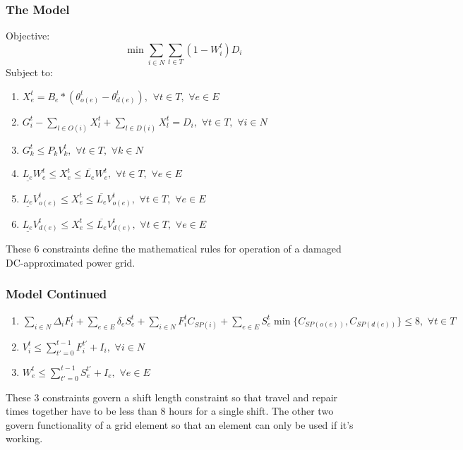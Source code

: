 \documentclass[t, pdftex]{beamer}
\begin{document}
\begin{frame}
\frametitle{The Model}
Objective:
$$ \min \sum_{i \in N} \sum_{t \in T} (1-W_i^t)D_i $$
Subject to:
	\begin{enumerate}[label=(\arabic*), leftmargin=*, itemsep=0.4ex, before={\everymath{\displaystyle}}]
	
	\item $ X_e^t = B_e * (\theta_{o(e)}^t - \theta_{d(e)}^t), \hspace{5pt} \forall t \in T, \hspace{4pt} \forall e \in E$
	\item $ G_i^t - \sum_{l \in O(i)} X_l^t + \sum_{l \in D(i)} X_l^t = D_i, \hspace{4pt} \forall t \in T, \hspace{4pt} \forall i \in N$
	\item $G_k^t \leq P_{k} V_{k}^t, \hspace{4pt} \forall t \in T, \hspace{4pt} \forall k \in N$
	\item $\underline{L_e}W_{e}^t \leq X_{e}^t \leq \overline{L_e}W_{e}^t, \hspace{4pt} \forall t \in T, \hspace{4pt} \forall e \in E$
	\item $\underline{L_e}V_{o(e)}^t \leq X_{e}^t \leq \overline{L_e}V_{o(e)}^t, \hspace{4pt} \forall t \in T, \hspace{4pt} \forall e \in E$
	\item $\underline{L_e}V_{d(e)}^t \leq X_{e}^t \leq \overline{L_e}V_{d(e)}^t, \hspace{4pt} \forall t \in T, \hspace{4pt} \forall e \in E$
	\end{enumerate}
These 6 constraints define the mathematical rules for operation of a damaged DC-approximated power grid.
\end{frame}
\begin{frame}
\frametitle{Model Continued}
	\begin{enumerate}[label=(\arabic*), leftmargin=*, itemsep=0.4ex, before={\everymath{\displaystyle}}]
	\item $\sum_{i \in N} \Delta_{i} F_{i}^t + \sum_{e \in E} \delta_{e} S_{e}^t + \sum_{i \in N} F_i^t C_{SP(i)} + \sum_{e \in E} S_{e}^t  \min \{C_{SP(o(e))},C_{SP(d(e))} \} \leq 8, \hspace{4pt} \forall t \in T \hspace{4pt}$
\item $V_i^t \leq \sum_{t'=0}^{t-1} F_i^{t'}+I_i, \hspace{4pt} \forall i \in N$ 
\item $W_{e}^t \leq \sum_{t'=0}^{t-1} S_{e}^{t'}+I_e, \hspace{4pt} \forall e \in E $
\end{enumerate}
These 3 constraints govern a shift length constraint so that travel and repair times together have to be less than 8 hours for a single shift. The other two govern functionality of a grid element so that an element can only be used if it's working.
\end{frame}
\end{document}
